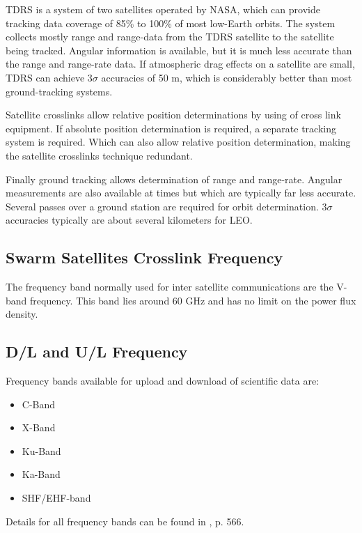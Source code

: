\acs{TDRS} is a system of two satellites operated by NASA, which can provide tracking data coverage of 85\% to 100\% of most low-Earth orbits. The system collects mostly range and range-data from the \acs{TDRS} satellite to the satellite being tracked. Angular information is available, but it is much less accurate than the range and range-rate data. If atmospheric drag effects on a satellite are small, \acs{TDRS} can achieve 3$\sigma$ accuracies of 50 m, which is considerably better than most ground-tracking systems.

Satellite crosslinks allow relative position determinations by using of cross link equipment. If absolute position determination is required, a separate tracking system is required. Which can also allow relative position determination, making the satellite crosslinks technique redundant.

Finally ground tracking allows determination of range and range-rate. Angular measurements are also available at times but which are typically far less accurate. Several passes over a ground station are required for orbit determination. 3$\sigma$ accuracies typically are about several kilometers for \ac{LEO}.

\subsection{Swarm Satellites Crosslink Frequency}
The frequency band normally used for inter satellite communications are the V-band frequency. This band lies around 60 GHz and has no limit on the power flux density.

\subsection{D/L and U/L Frequency}
Frequency bands available for upload and download of scientific data are:
\begin{itemize}
\item C-Band
\item X-Band
\item Ku-Band
\item Ka-Band
\item SHF/EHF-band
\end{itemize}

Details for all frequency bands can be found in \cite{larson}, p. 566.

